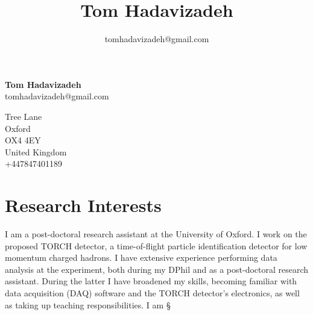 \documentclass[11pt,a4paper]{article}
\title{\bfseries\Huge Tom Hadavizadeh}
\author{tomhadavizadeh@gmail.com}
\begin{document}
\begin{minipage}[ht]{0.70\textwidth}
{\bfseries\Huge Tom Hadavizadeh}\\[10pt]
{\Large tomhadavizadeh@gmail.com}\\


\end{minipage}
\begin{minipage}[ht]{0.30\textwidth}
{ Tree Lane\\
Oxford\\
OX4 4EY\\
United Kingdom\\
+447847401189\\}
\end{minipage}


\section*{Research Interests}
I am a post-doctoral research assistant at the University of Oxford. I work on the proposed TORCH detector, a time-of-flight particle identification detector for low momentum charged hadrons. I have extensive experience performing data analysis at the \lhcb experiment, both during my DPhil and as a post-doctoral research assistant. During the latter I have broadened my skills, becoming familiar with data acquisition (DAQ) software and the TORCH detector's electronics, as well as taking up teaching responsibilities. I am § 
\end{document}
